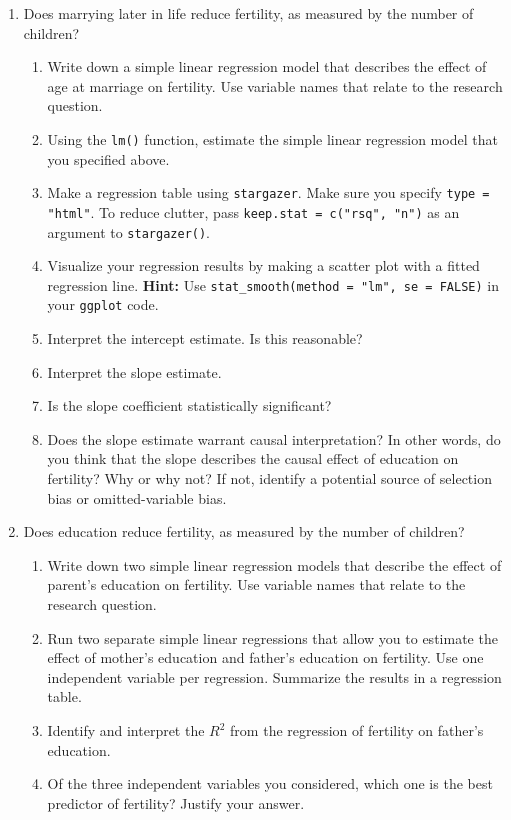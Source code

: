 \documentclass[11pt]{article}
\begin{document}
\begin{onehalfspacing}
\begin{enumerate}
\item Does marrying later in life reduce fertility, as measured by the number of children? 
\begin{enumerate}
	\item Write down a simple linear regression model that describes the effect of age at marriage on fertility. Use variable names that relate to the research question.
	\item Using the \texttt{lm()} function, estimate the simple linear regression model that you specified above.
	\item  Make a regression table using \texttt{stargazer}. Make sure you specify \texttt{type = "html"}. To reduce clutter, pass \texttt{keep.stat = c("rsq", "n")} as an argument to \texttt{stargazer()}.
	\item Visualize your regression results by making a scatter plot with a fitted regression line. \textbf{Hint:} Use \texttt{stat\_smooth(method = "lm", se = FALSE)} in your \texttt{ggplot} code.
	\item  Interpret the intercept estimate. Is this reasonable?
	\item  Interpret the slope estimate.
	\item Is the slope coefficient statistically significant? 
	\item Does the slope estimate warrant causal interpretation? In other words, do you think that the slope describes the causal effect of education on fertility? Why or why not? If not, identify a potential source of selection bias or omitted-variable bias.
\end{enumerate}

\item Does education reduce fertility, as measured by the number of children? 
\begin{enumerate}
	\item Write down two simple linear regression models that describe the effect of parent's education on fertility. Use variable names that relate to the research question.
	\item Run two separate simple linear regressions that allow you to estimate the effect of mother's education and father's education on fertility. Use one independent variable per regression. Summarize the results in a regression table.
	\item Identify and interpret the $R^2$ from the regression of fertility on father's education.
	\item Of the three independent variables you considered, which one is the best predictor of fertility? Justify your answer. 
\end{enumerate}
\end{enumerate}


\end{onehalfspacing}
\end{document}
